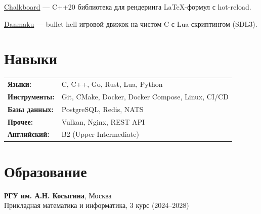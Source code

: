\documentclass[a4paper,11pt]{article}
\begin{document}
\href{https://github.com/koftamainee/chalkboard}{Chalkboard} --- C++20 библиотека для рендеринга LaTeX-формул с hot-reload.

\href{https://github.com/koftamainee/danmaku}{Danmaku} --- bullet hell игровой движок на чистом C с Lua-скриптингом (SDL3).

\section{Навыки}

\begin{tabular}{@{}ll}
\textbf{Языки:} & C, C++, Go, Rust, Lua, Python \\
\textbf{Инструменты:} & Git, CMake, Docker, Docker Compose, Linux, CI/CD \\
\textbf{Базы данных:} & PostgreSQL, Redis, NATS \\
\textbf{Прочее:} & Vulkan, Nginx, REST API \\
\textbf{Английский:} & B2 (Upper-Intermediate) \\
\end{tabular}

\section{Образование}

  \textbf{РГУ им. А.Н. Косыгина}, Москва \\
  Прикладная математика и информатика, 3 курс (2024--2028)
\end{document}

